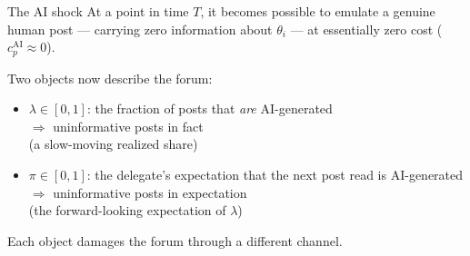 \documentclass[11pt,aspectratio=169]{beamer}
\newenvironment{wideitemize}{\begin{itemize}\setlength{\itemsep}{0.7em}}{\end{itemize}}
\begin{document}
\begin{frame}{The AI shock}
  At a point in time $T$, it becomes possible to emulate a genuine human post ---
  carrying zero information about $\theta_i$ --- at essentially zero cost
  ($c_p^{\text{AI}} \approx 0$).
  \vspace{0.6em}

  Two objects now describe the forum:
  \begin{wideitemize}
    \item $\lambda \in [0,1]$: the fraction of posts that \emph{are} AI-generated\\
      $\Rightarrow$ uninformative posts \alert{in fact}\\
      {\small (a slow-moving realized share)}
    \item $\pi \in [0,1]$: the delegate's expectation that the next post read is
      AI-generated\\
      $\Rightarrow$ uninformative posts \alert{in expectation}\\
      {\small (the forward-looking expectation of $\lambda$)}
  \end{wideitemize}
  \vspace{0.6em}
  Each object damages the forum through a different channel.
\end{frame}
\end{document}

